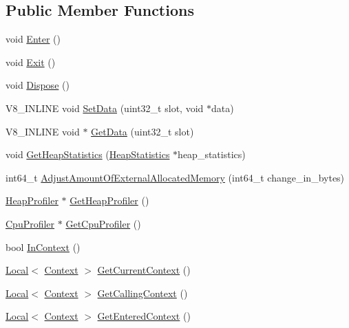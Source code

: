 \subsection*{Public Member Functions}
\begin{DoxyCompactItemize}
\item 
void \hyperlink{classv8_1_1_isolate_aec80bb49b6b7647ff75e8f2cc9484ea3}{Enter} ()
\item 
void \hyperlink{classv8_1_1_isolate_a64a8503cafd00d1d2cadfbb0c2345054}{Exit} ()
\item 
void \hyperlink{classv8_1_1_isolate_a1a5a5762e4221aff8c6b10f9e3cec0af}{Dispose} ()
\item 
V8\+\_\+\+I\+N\+L\+I\+N\+E void \hyperlink{classv8_1_1_isolate_a2ae968a7ff8a397f1ac09d32990883f6}{Set\+Data} (uint32\+\_\+t slot, void $\ast$data)
\item 
V8\+\_\+\+I\+N\+L\+I\+N\+E void $\ast$ \hyperlink{classv8_1_1_isolate_aed85b3c82bf69a60ecebc2558ab95083}{Get\+Data} (uint32\+\_\+t slot)
\item 
void \hyperlink{classv8_1_1_isolate_add32e78544edaf8946ed9b328167e5e4}{Get\+Heap\+Statistics} (\hyperlink{classv8_1_1_heap_statistics}{Heap\+Statistics} $\ast$heap\+\_\+statistics)
\item 
int64\+\_\+t \hyperlink{classv8_1_1_isolate_aaeda5fa60961a3d9d476c46200e30711}{Adjust\+Amount\+Of\+External\+Allocated\+Memory} (int64\+\_\+t change\+\_\+in\+\_\+bytes)
\item 
\hyperlink{classv8_1_1_heap_profiler}{Heap\+Profiler} $\ast$ \hyperlink{classv8_1_1_isolate_a9c48259615e8370f6f0efd27cd7f99a6}{Get\+Heap\+Profiler} ()
\item 
\hyperlink{classv8_1_1_cpu_profiler}{Cpu\+Profiler} $\ast$ \hyperlink{classv8_1_1_isolate_a7eb415d9210d912aa57877ab6416fec8}{Get\+Cpu\+Profiler} ()
\item 
bool \hyperlink{classv8_1_1_isolate_afb6bbd31a87d0999dbbe5402447690a9}{In\+Context} ()
\item 
\hyperlink{classv8_1_1_local}{Local}$<$ \hyperlink{classv8_1_1_context}{Context} $>$ \hyperlink{classv8_1_1_isolate_afa1b6cde5a7a7cfde87eaabc4ab34062}{Get\+Current\+Context} ()
\item 
\hyperlink{classv8_1_1_local}{Local}$<$ \hyperlink{classv8_1_1_context}{Context} $>$ \hyperlink{classv8_1_1_isolate_a2fba719b7a022ece0b0bfe55f52b3138}{Get\+Calling\+Context} ()
\item 
\hyperlink{classv8_1_1_local}{Local}$<$ \hyperlink{classv8_1_1_context}{Context} $>$ \hyperlink{classv8_1_1_isolate_aff9eb2f5d199f8fcf59d9699194cd2e3}{Get\+Entered\+Context} ()

\end{DoxyCompactItemize}
